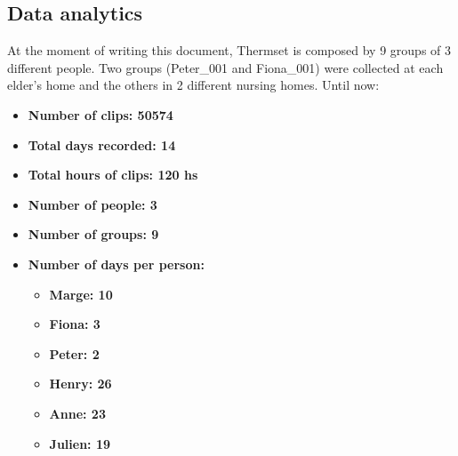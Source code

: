 \documentclass[oneside, twocolumn]{article}
\newcommand\NumberOfGroups{9}
\newcommand\TotalHoursOfRecording{120}
\newcommand\TotalNumbersOfDays{14}
\newcommand\NumberOfPeople{3}
\newcommand\NumberOfClips{50574}
\newcommand\FemaleDays{57}
\newcommand\MaleDays{82}
\newcommand\LessThanSixtyFiveDays{49}
\newcommand\LessThanSeventyFiveDays{15}
\newcommand\LessThanEightyFiveDays{39}
\newcommand\MoreThanEightyFiveDays{36}
\newcommand\HenryDays{26}
\newcommand\AnneDays{23}
\newcommand\JulienDays{19}
\newcommand\MargeDays{10}
\newcommand\FionaDays{3}
\newcommand\PeterDays{2}
\begin{document}
\subsection{Data analytics}
At the moment of writing this document, Thermset is composed by \NumberOfGroups{} groups of \NumberOfPeople{} different people.
Two groups (Peter\_001 and Fiona\_001) were collected at each elder's home and the others in 2 different
nursing homes. Until now:

\begin{itemize}
	\item \textbf{Number of clips: \NumberOfClips{}}
  \item \textbf{Total days recorded: \TotalNumbersOfDays{}}
  \item \textbf{Total hours of clips: \TotalHoursOfRecording{} hs}
  \item \textbf{Number of people: \NumberOfPeople{}}
  \item \textbf{Number of groups: \NumberOfGroups{}}

  \item \textbf{Number of days per person:}
  \begin{itemize}
    \item \textbf{Marge: \MargeDays{}}
    \item \textbf{Fiona: \FionaDays{}}
    \item \textbf{Peter: \PeterDays{}}
    \iffalse
    \item \textbf{Henry: \HenryDays{}}
    \item \textbf{Anne: \AnneDays{}}
    \item \textbf{Julien: \JulienDays{}}

\end{itemize}
\end{itemize}
\end{document}
